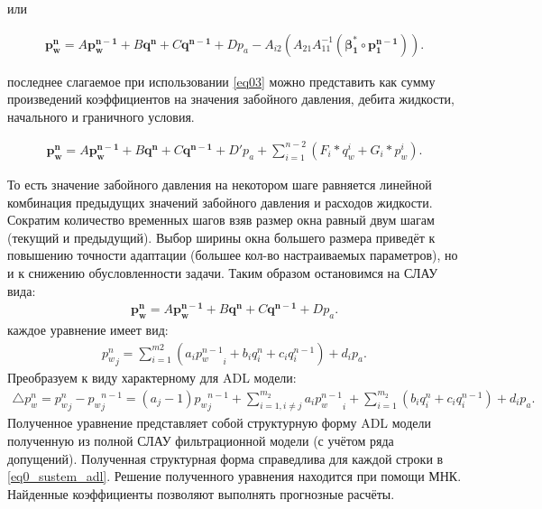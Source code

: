 \documentclass[14pt]{article}
\begin{document}
или 

\begin{eqnarray} \label{eq010}
	\mathbf {p_w^n} = A  \mathbf {p_w^{n-1}}
	+ B \mathbf{q^n} + C \mathbf{q^{n-1}} + D p_a  
	- 	A_{i2} \left(A_{21} A_{11}^{-1} \left(\boldsymbol{\beta_1^*} \circ  \mathbf {p_1^{n-1}}\right)\right).
\end{eqnarray}

последнее слагаемое при использовании \ref{eq03} можно представить как сумму произведений коэффициентов на значения забойного давления, дебита жидкости, начального и граничного условия. 

\begin{eqnarray} \label{eq010}
	\mathbf {p_w^n} = A  \mathbf {p_w^{n-1}}
	+ B \mathbf{q^n} + C \mathbf{q^{n-1}} + D' p_a  
	+ \sum_{i=1}^{n-2}{\left(F_i*q_w^i + G_i*p_w^i\right)}.
\end{eqnarray}

То есть значение забойного давления на некотором шаге равняется линейной комбинация предыдущих значений забойного давления и расходов жидкости. Сократим количество временных шагов взяв размер окна равный двум шагам (текущий и предыдущий). Выбор ширины окна большего размера приведёт к повышению точности адаптации (большее кол-во настраиваемых параметров), но и к снижению обусловленности задачи. Таким образом остановимся на СЛАУ вида: 
\begin{eqnarray} \label{eq0_sustem_adl}
	\mathbf {p_w^n} = A  \mathbf {p_w^{n-1}}
	+ B \mathbf{q^n} + C \mathbf{q^{n-1}} + D p_a.
\end{eqnarray}
каждое уравнение имеет вид:
\begin{eqnarray} \label{eq0_adl_adl}
{p_w^n}_j = \sum_{i=1}^{m2}{\left( a_i {p_w^{n-1}}_i
+ b_i q_i^n + c_i q^{n-1}_i\right)} + d_i p_a.
\end{eqnarray}
Преобразуем к виду характерному для ADL модели:
\begin{eqnarray} \label{eq0_adl_adl}
	\triangle p_w^n={p_w^n}_j -  {p_w}_j^{n-1}= \left(a_j-1\right){p_w}_j^{n-1} + \sum_{i=1, i\neq j}^{m_2}{a_i {p_w^{n-1}}_i}
		+ \sum_{i=1}^{m_2}{\left( b_i q_i^n + c_i q^{n-1}_i\right)} + d_i p_a.
\end{eqnarray}
Полученное уравнение представляет собой структурную форму ADL модели полученную из полной СЛАУ фильтрационной модели (с учётом ряда допущений). Полученная структурная форма справедлива для каждой строки в \ref{eq0_sustem_adl}. Решение полученного уравнения находится при помощи МНК. Найденные коэффициенты позволяют выполнять прогнозные расчёты. 
\end{document}
